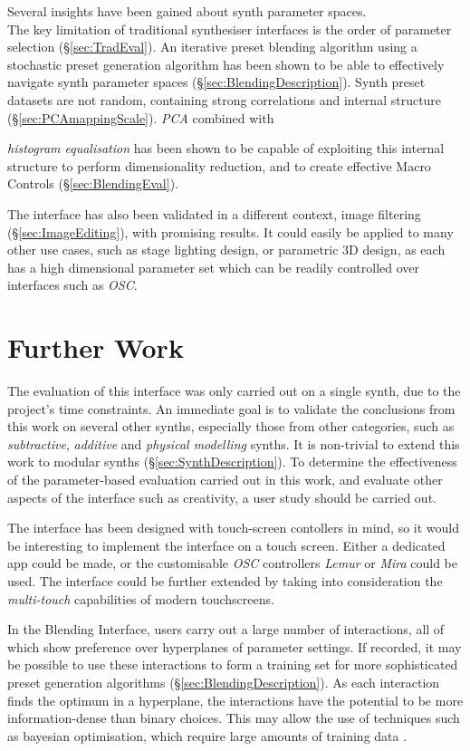 \documentclass[11pt, oneside]{report}   	%
\begin{document}
Several insights have been gained about synth parameter spaces. \\
The key limitation of traditional synthesiser interfaces is the order of parameter selection (\S \ref{sec:TradEval}). An iterative preset blending algorithm using a stochastic preset generation algorithm has been shown to be able to effectively navigate synth parameter spaces (\S \ref{sec:BlendingDescription}). Synth preset datasets are not random, containing strong correlations and internal structure (\S \ref{sec:PCAmappingScale}). \emph{PCA} combined with {\emph{histogram equalisation} has been shown to be capable of exploiting this internal structure to perform dimensionality reduction, and to create effective Macro Controls (\S \ref{sec:BlendingEval}).
	
The interface has also been validated in a different context, image filtering (\S \ref{sec:ImageEditing}), with promising results. It could easily be applied to many other use cases, such as stage lighting design, or parametric 3D design, as each has a high dimensional parameter set which can be readily controlled over interfaces such as \emph{OSC}.
\section{Further Work}
The evaluation of this interface was only carried out on a single synth, due to the project's time constraints. An immediate goal is to validate the conclusions from this work on several other synths, especially those from other categories, such as \emph{subtractive}, \emph{additive} and \emph{physical modelling} synths. It is non-trivial to extend this work to modular synths (\S \ref{sec:SynthDescription}). To determine the effectiveness of the parameter-based evaluation carried out in this work, and evaluate other aspects of the interface such as creativity, a user study should be carried out.

The interface has been designed with touch-screen contollers in mind, so it would be interesting to implement the interface on a touch screen. Either a dedicated app could be made, or the customisable \emph{OSC} controllers \emph{Lemur} or \emph{Mira} could be used. The interface could be further extended by taking into consideration the \emph{multi-touch} capabilities of modern touchscreens.

In the Blending Interface, users carry out a large number of interactions, all of which show preference over hyperplanes of parameter settings. If recorded, it may be possible to use these interactions to form a training set for more sophisticated preset generation algorithms (\S \ref{sec:BlendingDescription}). As each interaction finds the optimum in a hyperplane, the interactions have the potential to be more information-dense than binary choices. This may allow the use of techniques such as bayesian optimisation, which require large amounts of training data \cite{PreferenceGallery}. 
%

}
\end{document}
